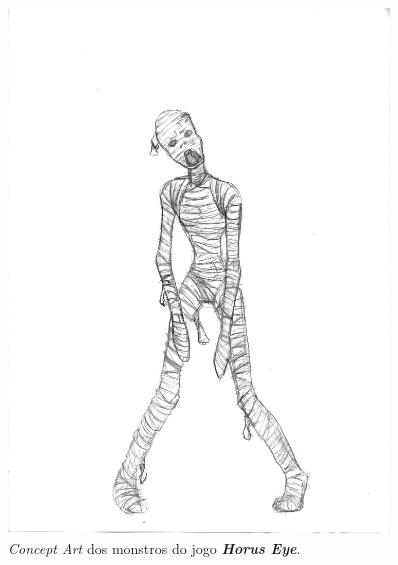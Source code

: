 \documentclass[12pt,onecolumn,a4paper]{article}
\begin{document}
        \begin{figure}[htb]
            \centering
            \includegraphics[width=0.9\textwidth]{images/concept_mummy.jpg}
            \caption{\textit{Concept Art} dos monstros do jogo \textit{\textbf{Horus Eye}}.}
            \label{fig:concept_02}
        \end{figure}
        
\end{document}
